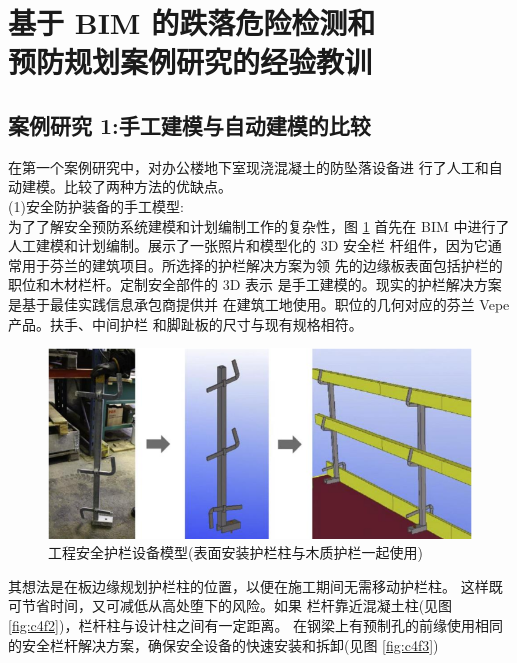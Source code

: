 \section{基于 BIM 的跌落危险检测和\\预防规划案例研究的经验教训}
\subsection{案例研究 1:手工建模与自动建模的比较}

在第一个案例研究中，对办公楼地下室现浇混凝土的防坠落设备进
行了人工和自动建模。比较了两种方法的优缺点。\\

(1)安全防护装备的手工模型:\\

为了了解安全预防系统建模和计划编制工作的复杂性，图 \ref{fig:c4f1} 首先在 BIM
中进行了人工建模和计划编制。展示了一张照片和模型化的 3D 安全栏
杆组件，因为它通常用于芬兰的建筑项目。所选择的护栏解决方案为领
先的边缘板表面包括护栏的职位和木材栏杆。定制安全部件的 3D 表示
是手工建模的。现实的护栏解决方案是基于最佳实践信息承包商提供并
在建筑工地使用。职位的几何对应的芬兰 Vepe 产品。扶手、中间护栏
和脚趾板的尺寸与现有规格相符。

\begin{figure}[thbp!]
    \centering
    \includegraphics[width=1.0\linewidth]{res/c4f1.png}
    \caption{工程安全护栏设备模型(表面安装护栏柱与木质护栏一起使用)}
    \label{fig:c4f1}
\end{figure}

其想法是在板边缘规划护栏柱的位置，以便在施工期间无需移动护栏柱。
这样既可节省时间，又可减低从高处堕下的风险。如果
栏杆靠近混凝土柱(见图 \ref{fig:c4f2})，栏杆柱与设计柱之间有一定距离。
在钢梁上有预制孔的前缘使用相同的安全栏杆解决方案，确保安全设备的快速安装和拆卸(见图 \ref{fig:c4f3})

